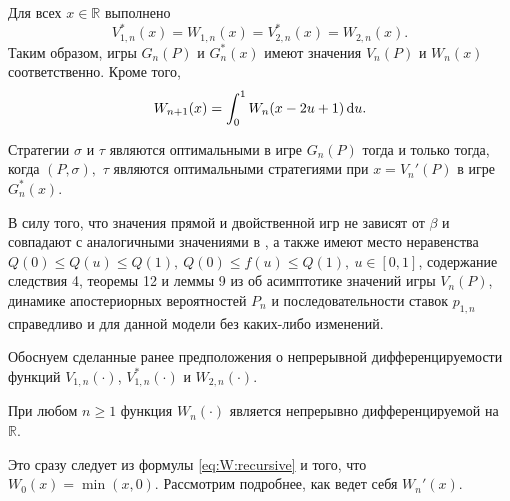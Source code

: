 {\begin{theorem}\label{theorem:dual:relations}
  Для всех $x \in \mathbb{R}$ выполнено
  \begin{equation}\label{eq:duality:relationships}
    V_{1,n}^*(x) = W_{1,n}(x) = V_{2,n}^*(x) = W_{2,n}(x).
  \end{equation}
  Таким образом, игры $G_n(P)$ и $G_n^*(x)$ имеют значения $V_n(P)$ и $W_n(x)$ соответственно.
  Кроме того,
  \begin{equation}\label{eq:W:recursive}
    W_{n+1}(x) = \int_0^1 W_n(x - 2u + 1) \mathop{}\!\mathrm{d} u.
  \end{equation}
\end{theorem}

\begin{theorem}\label{theorem:optimal-strategies}
  Стратегии $\sigma$ и $\tau$ являются оптимальными в игре $G_n(P)$ тогда и только тогда, когда $(P, \sigma),$ $\tau$ являются оптимальными стратегиями при $x = V_n'(P)$ в игре $G_n^*(x)$.
\end{theorem}

В силу того, что значения прямой и двойственной игр не зависят от $\beta$ и совпадают с аналогичными значениями в \cite{demeyer02}, а также имеют место неравенства
$Q(0) \leqslant Q(u) \leqslant Q(1),\ Q(0) \leqslant f(u) \leqslant Q(1),\ u \in [0, 1]$,
содержание следствия 4, теоремы 12 и леммы 9 из \cite{demeyer02} об асимптотике значений игры $V_n(P)$, динамике апостериорных вероятностей $P_n$ и последовательности ставок $p_{1,n}$ справедливо и для данной модели без каких-либо изменений.

Обоснуем сделанные ранее предположения о непрерывной дифференцируемости функций $V_{1,n}(\cdot)$, $V_{1,n}^*(\cdot)$ и $W_{2,n}(\cdot)$.

\begin{proposition}
  При любом $n \geqslant 1$ функция $W_n(\cdot)$ является непрерывно дифференцируемой на $\mathbb{R}$.
\end{proposition}
Это сразу следует из формулы \eqref{eq:W:recursive} и того, что $W_0(x) = \min(x, 0)$.
Рассмотрим подробнее, как ведет себя $W_n'(x)$.

}
